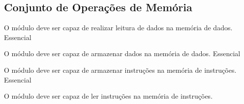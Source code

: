 \subsection{Conjunto de Operações de Memória}

	  \begin{functional}
		{O módulo deve ser capaz de realizar leitura de dados na memória de dados.}
		{Essencial}
		
        {O módulo deve ser capaz de armazenar dados na memória de dados.}
        {Essencial}

		{O módulo deve ser capaz de armazenar instruções na memória de instruções.}
		{Essencial}
		
		{O módulo deve ser capaz de ler instruções na memória de instruções.}
	
		 
	 \end{functional}